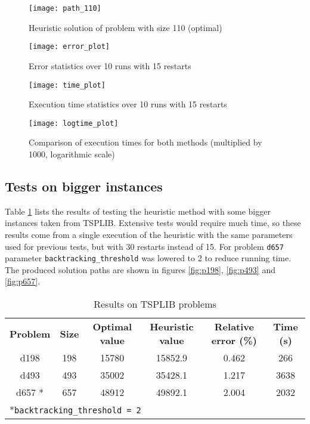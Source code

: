 

\begin{figure}[H]
	\centering
	\texttt{[image: path\_110]}
	\caption{Heuristic solution of problem with size 110 (optimal)}
	\label{fig:path110}
\end{figure}

\begin{figure}[H]
	\centering
	\texttt{[image: error\_plot]}
	\caption{Error statistics over 10 runs with 15 restarts}
	\label{fig:ploterr}
\end{figure}

\begin{figure}[H]
	\centering
	\texttt{[image: time\_plot]}
	\caption{Execution time statistics over 10 runs with 15 restarts}
	\label{fig:plotime}
\end{figure}

\begin{figure}[H]
	\centering
	\texttt{[image: logtime\_plot]}
	\caption{Comparison of execution times for both methods (multiplied by 1000, logarithmic scale)}
	\label{fig:logtime}
\end{figure}

\subsection{Tests on bigger instances}
Table \ref{tab:tsplibr} lists the results of testing the heuristic method with some bigger instances taken from TSPLIB. Extensive tests would require much time, so these results come from a single execution of the heuristic with the same parameters used for previous tests, but with 30 restarts instead of 15. For problem \texttt{d657} parameter \texttt{backtracking\_threshold} was lowered to 2 to reduce running time.  The produced solution paths are shown in figures \ref{fig:p198}, \ref{fig:p493} and \ref{fig:p657}.

\begin{table}[h]
	\caption{Results on TSPLIB problems}
	\label{tab:tsplibr}
	\centering
	\begin{tabular}[t]{cccccc}
		\rowcolor[HTML]{EFEFEF}
		\textbf{Problem} & \textbf{Size} & \textbf{Optimal value} & \textbf{Heuristic value} & \textbf{Relative error (\%)} & \textbf{Time (s)} \\
		d198    & 198 & 15780 & 15852.9 & 0.462  & 266   \\
		d493    & 493 & 35002 & 35428.1 & 1.217 & 3638	\\
		d657 *	& 657 & 48912 & 49892.1 & 2.004	&  2032 \\
		\multicolumn{6}{l}{\rule{0pt}{4ex}*\texttt{backtracking\_threshold = 2}} 
	\end{tabular}
\end{table}

